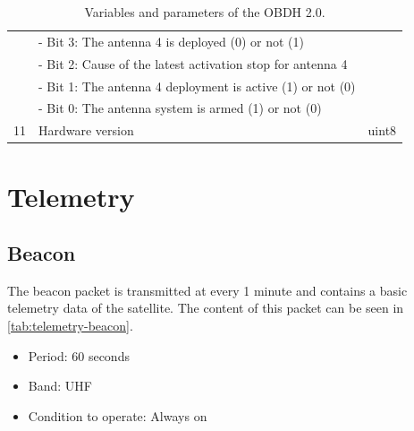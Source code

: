 \begin{table}[!h]
\begin{tabular}{cL{0.82\textwidth}l}
            & - Bit 3: The antenna 4 is deployed (0) or not (1)       &        \\
            & - Bit 2: Cause of the latest activation stop for antenna 4 &     \\
            & - Bit 1: The antenna 4 deployment is active (1) or not (0) &     \\
            & - Bit 0: The antenna system is armed (1) or not (0)     &        \\
        11  & Hardware version                                        & uint8 \\
        \bottomrule[1.5pt]
    \end{tabular}
    \caption{Variables and parameters of the OBDH 2.0.}
    \label{tab:vars-and-pars}
\end{table}

\section{Telemetry}


\subsection{Beacon}

The beacon packet is transmitted at every 1 minute and contains a basic telemetry data of the satellite. The content of this packet can be seen in \autoref{tab:telemetry-beacon}.

\begin{itemize}
    \item Period: 60 seconds
    \item Band: UHF
    \item Condition to operate: Always on
\end{itemize}


